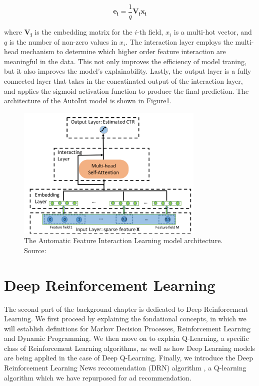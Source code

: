 \documentclass{mldsmsc}
\begin{document}
$$
\mathbf{e_i} = \frac{1}{q} \mathbf{V_i x_i}
$$

where $\mathbf{V_i}$ is the embedding matrix for the $i$-th field, $x_i$ is a multi-hot vector, and $q$ 
is the number of non-zero values in $x_i$. The interaction layer employs the multi-head
mechanism to determine which higher order feature interaction are meaningful in the data. This not only
improves the efficiency of model traning, but it also improves the model's explainability. Lastly,
the output layer is a fully connected layer that takes in the concatinated output 
of the interaction layer, and applies the sigmoid activation function to produce the final prediction.
The architecture of the AutoInt model is shown in Figure\ref{fig:autoint}.

\begin{figure}[h]
    \centering
    \includegraphics[width=0.8\textwidth]{../figures/autoint.png}
    \caption{The Automatic Feature Interaction Learning model architecture. Source: \citep{RefWorks:song2019autoint}}
    \label{fig:autoint}
\end{figure}


\section{Deep Reinforcement Learning}

The second part of the background chapter is dedicated to Deep Reinforcement Learning. We first
proceed by explaining the fondational concepts, in which we will establish definitions for
Markov Decision Processes, Reinforcement Learning and Dynamic Programming. We then move on to explain
Q-Learning, a specific class of Reinforcement Learning algorithms, as well as how Deep Learning
models are being applied in the case of Deep Q-Learning. Finally, we introduce the Deep Reinforcement
Learning News reccomendation (DRN) algorithm \citep{RefWorks:zheng2018drn:}, a Q-learning algorithm
which we have repurposed for ad recommendation.
\end{document}
